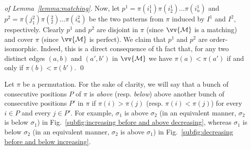 \documentclass[a4paper]{llncs}
\newcommand{\LabeledCrossingLR}[5]{%
\begin{tikzpicture}[scale=#1,inner sep=.8pt,node distance=.45cm,>=latex',
                    text height=1.5ex,text depth=.25ex]
\draw node [] (U1)               {#2};
\draw node [] [right of=U1] (U2) {#3};
\draw node [] [right of=U2] (U3) {#4};
\draw node [] [right of=U3] (U4) {#5};
\draw [->] (U1.north) .. controls ($ (U1.north) + (0,1.5) $) and ($ (U3.north) + (0,1.5) $) .. (U3.north);
\draw [<-] (U2.north) .. controls ($ (U2.north) + (0,1.5) $) and ($ (U4.north) + (0,1.5) $) .. (U4.north);
\end{tikzpicture}
}%
\newcommand{\CrossingLR}{%
\begin{tikzpicture}[yscale=0.08,xscale=0.09,inner sep=.8pt,node distance=.25cm,>=latex']%
\draw node [draw,circle,fill=black] (U1)               {};
\draw node [draw,circle,fill=black] [right of=U1] (U2) {};
\draw node [draw,circle,fill=black] [right of=U2] (U3) {};
\draw node [draw,circle,fill=black] [right of=U3] (U4) {};
\draw [->] (U1.north) .. controls ($ (U1.north) + (0,4) $) and ($ (U3.north) + (0,4) $) .. (U3.north);
\draw [<-] (U2.north) .. controls ($ (U2.north) + (0,4) $) and ($ (U4.north) + (0,4) $) .. (U4.north);
\end{tikzpicture}
}%
\newcommand{\LabeledCrossingRL}[5]{%
\begin{tikzpicture}[scale=#1,inner sep=.8pt,node distance=.45cm,>=latex',
                    text height=1.5ex,text depth=.25ex]
\draw node [] (U1)               {#2};
\draw node [] [right of=U1] (U2) {#3};
\draw node [] [right of=U2] (U3) {#4};
\draw node [] [right of=U3] (U4) {#5};
\draw [<-] (U1.north) .. controls ($ (U1.north) + (0,1.5) $) and ($ (U3.north) + (0,1.5) $) .. (U3.north);
\draw [->] (U2.north) .. controls ($ (U2.north) + (0,1.5) $) and ($ (U4.north) + (0,1.5) $) .. (U4.north);
\end{tikzpicture}
}%
\newcommand{\CrossingRL}{%
\begin{tikzpicture}[yscale=0.08,xscale=0.09,inner sep=.8pt,node distance=.25cm,>=latex']%
\draw node [draw,circle,fill=black] (U1)               {};
\draw node [draw,circle,fill=black] [right of=U1] (U2) {};
\draw node [draw,circle,fill=black] [right of=U2] (U3) {};
\draw node [draw,circle,fill=black] [right of=U3] (U4) {};
\draw [<-] (U1.north) .. controls ($ (U1.north) + (0,4) $) and ($ (U3.north) + (0,4) $) .. (U3.north);
\draw [->] (U2.north) .. controls ($ (U2.north) + (0,4) $) and ($ (U4.north) + (0,4) $) .. (U4.north);
\end{tikzpicture}
}%
\newcommand{\LabeledInclusionLL}[5]{%
\begin{tikzpicture}[scale=#1,inner sep=.8pt,node distance=.45cm,>=latex',
                    text height=1.5ex,text depth=.25ex]
\draw node [] (U1)               {#2};
\draw node [] [right of=U1] (U2) {#3};
\draw node [] [right of=U2] (U3) {#4};
\draw node [] [right of=U3] (U4) {#5};
\draw [->] (U1.north) .. controls ($ (U1.north) + (0,2) $) and ($ (U4.north) + (0,2) $) .. (U4.north);
\draw [->] (U2.north) .. controls ($ (U2.north) + (0,1) $) and ($ (U3.north) + (0,1) $) .. (U3.north);
\end{tikzpicture}
}%
\newcommand{\InclusionLL}{%
\begin{tikzpicture}[yscale=0.08,xscale=0.09,inner sep=.8pt,node distance=.25cm,>=latex']
\draw node [draw,circle,fill=black] (U1)               {};
\draw node [draw,circle,fill=black] [right of=U1] (U2) {};
\draw node [draw,circle,fill=black] [right of=U2] (U3) {};
\draw node [draw,circle,fill=black] [right of=U3] (U4) {};
+\draw [->] (U4.north) .. controls ($ (U4.north) + (0,4) $) and ($ (U1.north) + (0,4) $) .. (U1.north);
+\draw [->] (U3.north) .. controls ($ (U3.north) + (0,3) $) and ($ (U2.north) + (0,3) $) .. (U2.north);
\end{tikzpicture}
}%
\newcommand{\InclusionLR}{%
\begin{tikzpicture}[yscale=0.08,xscale=0.09,inner sep=.8pt,node distance=.25cm,>=latex']
\draw node [draw,circle,fill=black] (U1)               {};
\draw node [draw,circle,fill=black] [right of=U1] (U2) {};
\draw node [draw,circle,fill=black] [right of=U2] (U3) {};
\draw node [draw,circle,fill=black] [right of=U3] (U4) {};
\draw [->] (U1.north) .. controls ($ (U1.north) + (0,4) $) and ($ (U4.north) + (0,4) $) .. (U4.north);
\draw [<-] (U2.north) .. controls ($ (U2.north) + (0,3) $) and ($ (U3.north) + (0,3) $) .. (U3.north);
\end{tikzpicture}
}%
\newcommand{\LabeledInclusionRL}[5]{%
\begin{tikzpicture}[scale=#1,inner sep=.8pt,node distance=.45cm,>=latex',
                    text height=1.5ex,text depth=.25ex]
\draw node [] (U1)               {#2};
\draw node [] [right of=U1] (U2) {#3};
\draw node [] [right of=U2] (U3) {#4};
\draw node [] [right of=U3] (U4) {#5};
\draw [<-] (U1.north) .. controls ($ (U1.north) + (0,2) $) and ($ (U4.north) + (0,2) $) .. (U4.north);
\draw [->] (U2.north) .. controls ($ (U2.north) + (0,1) $) and ($ (U3.north) + (0,1) $) .. (U3.north);
\end{tikzpicture}
}%
\newcommand{\InclusionRL}{%
\begin{tikzpicture}[yscale=0.08,xscale=0.09,inner sep=.8pt,node distance=.25cm,>=latex']
\draw node [draw,circle,fill=black] (U1)               {};
\draw node [draw,circle,fill=black] [right of=U1] (U2) {};
\draw node [draw,circle,fill=black] [right of=U2] (U3) {};
\draw node [draw,circle,fill=black] [right of=U3] (U4) {};
\draw [<-] (U1.north) .. controls ($ (U1.north) + (0,4) $) and ($ (U4.north) + (0,4) $) .. (U4.north);
\draw [->] (U2.north) .. controls ($ (U2.north) + (0,3) $) and ($ (U3.north) + (0,3) $) .. (U3.north);
\end{tikzpicture}
}%
\newcommand{\LabeledInclusionRR}[5]{%
\begin{tikzpicture}[scale=#1,inner sep=.8pt,node distance=.45cm,>=latex',
                    text height=1.5ex,text depth=.25ex]
\draw node [] (U1)               {#2};
\draw node [] [right of=U1] (U2) {#3};
\draw node [] [right of=U2] (U3) {#4};
\draw node [] [right of=U3] (U4) {#5};
\draw [<-] (U1.north) .. controls ($ (U1.north) + (0,2) $) and ($ (U4.north) + (0,2) $) .. (U4.north);
\draw [<-] (U2.north) .. controls ($ (U2.north) + (0,1) $) and ($ (U3.north) + (0,1) $) .. (U3.north);
\end{tikzpicture}
}%
\newcommand{\InclusionRR}{%
\begin{tikzpicture}[yscale=0.08,xscale=0.09,inner sep=.8pt,node distance=.25cm,>=latex']
\draw node [draw,circle,fill=black] (U1)               {};
\draw node [draw,circle,fill=black] [right of=U1] (U2) {};
\draw node [draw,circle,fill=black] [right of=U2] (U3) {};
\draw node [draw,circle,fill=black] [right of=U3] (U4) {};
\draw [->] (U1.north) .. controls ($ (U1.north) + (0,4) $) and ($ (U4.north) + (0,4) $) .. (U4.north);
\draw [->] (U2.north) .. controls ($ (U2.north) + (0,3) $) and ($ (U3.north) + (0,3) $) .. (U3.north);
\end{tikzpicture}
}%
\begin{document}
\begin{proof}[of Lemma~\ref{lemma:matching}]
    Now, let $p^1 = \pi(i^1_1) \pi(i^1_2) \dots \pi(i^1_n)$ and
    $p^2 = \pi(j^2_1) \pi(^2_2) \dots \pi(i^2_n)$ be the two patterns
    from $\pi$ induced by $I^1$ and $I^2$, respectively. Clearly $p^1$
    and $p^2$ are disjoint in $\pi$ (since $\vv{\mathcal{M}}$ is a
    matching) and cover $\pi$ (since $\vv{\mathcal{M}}$ is perfect). We
    claim that $p^1$ and $p^2$ are order-isomorphic. Indeed, this is a
    direct consequence of th fact that, for any two distinct edges
    $(a, b)$ and $(a', b')$ in $\vv{\mathcal{M}}$ we have $\pi(a) < \pi(a')$
    if and only if $\pi(b) < \pi(b')$.
    \qed
\end{proof}


Let $\pi$ be a permutation. For the sake of clarity, we will say that a
bunch of consecutive positions $P$ of $\pi$ is \emph{above} (resp.
\emph{below}) above another bunch of consecutive positions $P'$ in $\pi$
if $\pi(i) > \pi(j)$ (resp. $\pi(i) < \pi(j)$) for every $i \in P$ and
every $j \in P'$. For example, $\sigma_1$ is above $\sigma_2$ (in an
equivalent manner, $\sigma_2$ is below $\sigma_1$) in
Fig.~\ref{subfig:increasing before and above decreasing}, whereas
$\sigma_1$ is below $\sigma_2$ (in an equivalent manner, $\sigma_2$ is
above $\sigma_1$) in
Fig.~\ref{subfig:decreasing before and below increasing}.
\end{document}
